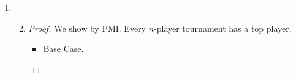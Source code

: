 \documentclass[12pt,letterpaper]{article}
\begin{document}
\begin{enumerate}
\begin{enumerate}
\begin{enumerate}
\begin{proof}
\begin{itemize}
                    \begin{align*}
                      \sqrt{n} &< \frac{1}{\sqrt{1}} + \frac{1}{\sqrt{2}} + \dots + \frac{1}{\sqrt{n}} \\
                      \sqrt{n}\left(\sqrt{n}\right) &< \sqrt{n}\left(\frac{1}{\sqrt{1}} + \frac{1}{\sqrt{2}} + \dots + \frac{1}{\sqrt{n}}\right) \\
                      n &< \sqrt{n}\left(\frac{1}{\sqrt{1}} + \frac{1}{\sqrt{2}} + \dots + \frac{1}{\sqrt{n}}\right) \\
                      n &< \sqrt{n + 1}\left(\frac{1}{\sqrt{1}} + \frac{1}{\sqrt{2}} + \dots + \frac{1}{\sqrt{n}}\right) \\
                      n + 1 &< \sqrt{n + 1}\left(\frac{1}{\sqrt{1}} + \frac{1}{\sqrt{2}} + \dots + \frac{1}{\sqrt{n}}\right) + \frac{\sqrt{n + 1}}{\sqrt{n + 1}} \\
                      n + 1 &< \sqrt{n + 1}\left(\frac{1}{\sqrt{1}} + \frac{1}{\sqrt{2}} + \dots + \frac{1}{\sqrt{n}} + \frac{1}{\sqrt{n + 1}}\right) \\
                      \sqrt{n + 1}\left(\sqrt{n + 1}\right) &< \sqrt{n + 1}\left(\frac{1}{\sqrt{1}} + \frac{1}{\sqrt{2}} + \dots + \frac{1}{\sqrt{n}} + \frac{1}{\sqrt{n + 1}}\right) \\
                      \sqrt{n + 1} &< \frac{1}{\sqrt{1}} + \frac{1}{\sqrt{2}} + \dots + \frac{1}{\sqrt{n}} + \frac{1}{\sqrt{n + 1}} \\
                    \end{align*}

                  \item
                    From the Base case and the inductive case,
                    we use the Generalized PMI to state:

                    $\sqrt{n} < \frac{1}{\sqrt{1}} + \frac{1}{\sqrt{2}} + \dots + \frac{1}{\sqrt{n}}$, for $n \geq 2$.
                \end{itemize}
              \end{proof}
          \end{enumerate}
        \setcounter{enumii}{11}
        \item
          \begin{enumerate}
            \setcounter{enumiii}{1}
            \item
              \begin{proof}
                We show by PMI.
                Every $n$-player tournament has a top player.
                \begin{itemize}
                  \item Base Case.


\end{itemize}
\end{proof}
\end{enumerate}
\end{enumerate}
\end{enumerate}
\end{document}
